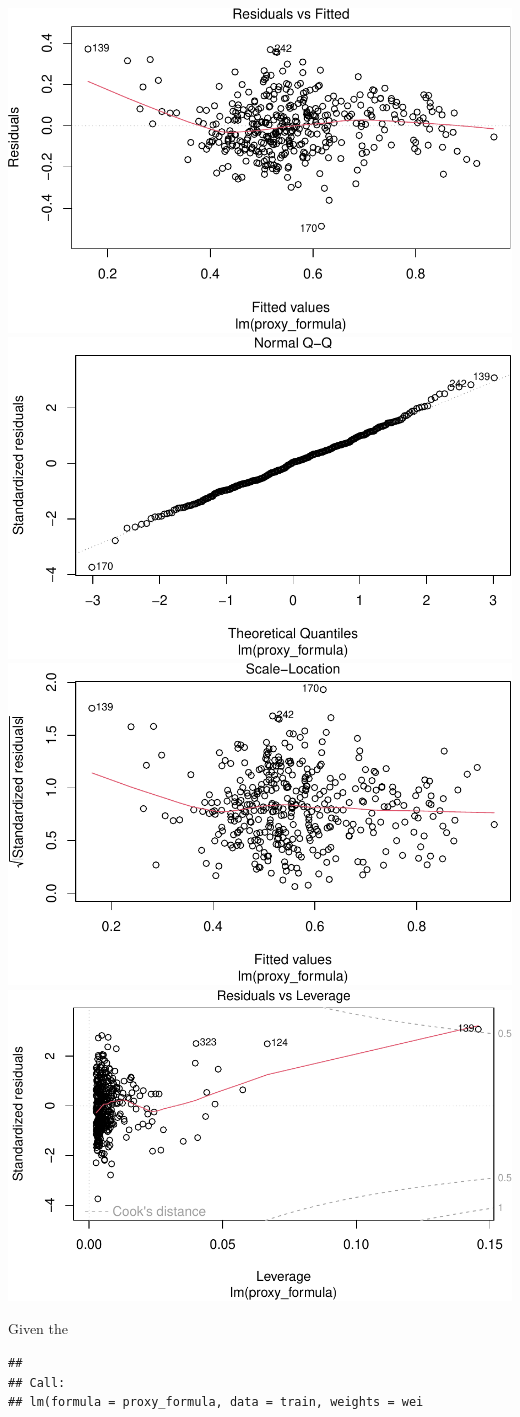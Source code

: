 \documentclass[
  man]{apa6}
\begin{document}
\includegraphics{final-project_files/figure-latex/plot-proxy-model-1.pdf} \includegraphics{final-project_files/figure-latex/plot-proxy-model-2.pdf} \includegraphics{final-project_files/figure-latex/plot-proxy-model-3.pdf} \includegraphics{final-project_files/figure-latex/plot-proxy-model-4.pdf}

Given the

\begin{verbatim}
## 
## Call:
## lm(formula = proxy_formula, data = train, weights = wei
\end{verbatim}
\end{document}
